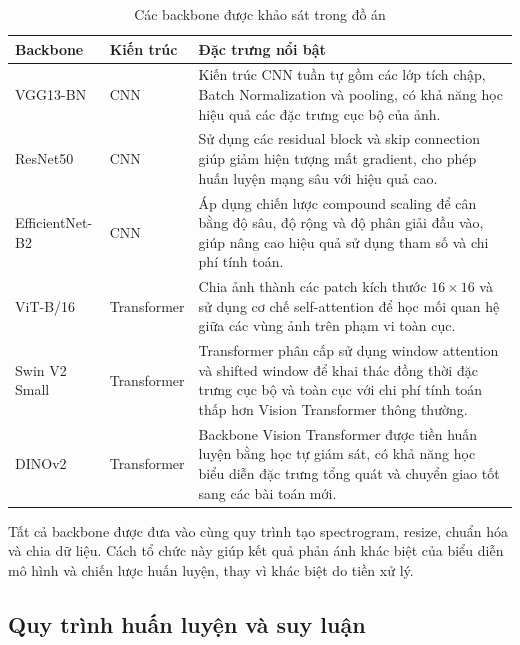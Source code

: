 \documentclass[../DoAn.tex]{subfiles}
\begin{document}
\begin{table}[ht]
\centering
\caption{Các backbone được khảo sát trong đồ án}
\label{tab:backbones}
\renewcommand{\arraystretch}{1.3}
\begin{tabular}{p{3cm} p{2.2cm} p{9.3cm}}
\hline
\textbf{Backbone} & \textbf{Kiến trúc} & \textbf{Đặc trưng nổi bật} \\
\hline

VGG13-BN &
CNN &
Kiến trúc CNN tuần tự gồm các lớp tích chập, Batch Normalization và pooling, có khả năng học hiệu quả các đặc trưng cục bộ của ảnh. \\

ResNet50 &
CNN &
Sử dụng các residual block và skip connection giúp giảm hiện tượng mất gradient, cho phép huấn luyện mạng sâu với hiệu quả cao. \\

EfficientNet-B2 &
CNN &
Áp dụng chiến lược compound scaling để cân bằng độ sâu, độ rộng và độ phân giải đầu vào, giúp nâng cao hiệu quả sử dụng tham số và chi phí tính toán. \\

ViT-B/16 &
Transformer &
Chia ảnh thành các patch kích thước $16\times16$ và sử dụng cơ chế self-attention để học mối quan hệ giữa các vùng ảnh trên phạm vi toàn cục. \\

Swin V2 Small &
Transformer &
Transformer phân cấp sử dụng window attention và shifted window để khai thác đồng thời đặc trưng cục bộ và toàn cục với chi phí tính toán thấp hơn Vision Transformer thông thường. \\

DINOv2 &
Transformer &
Backbone Vision Transformer được tiền huấn luyện bằng học tự giám sát, có khả năng học biểu diễn đặc trưng tổng quát và chuyển giao tốt sang các bài toán mới. \\

\hline
\end{tabular}
\end{table}

Tất cả backbone được đưa vào cùng quy trình tạo spectrogram, resize, chuẩn hóa và chia dữ liệu. Cách tổ chức này giúp kết quả phản ánh khác biệt của biểu diễn mô hình và chiến lược huấn luyện, thay vì khác biệt do tiền xử lý.

\subsection{Quy trình huấn luyện và suy luận}
\end{document}
